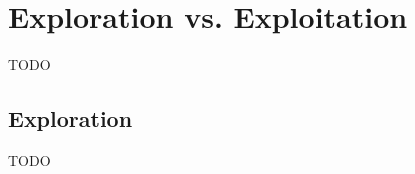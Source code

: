 

%
%
%
%


\section{Exploration vs. Exploitation}\label{sec:exploration-vs.-exploitation}
TODO
%
%

\subsection{Exploration}\label{subsec:exploration}
TODO

